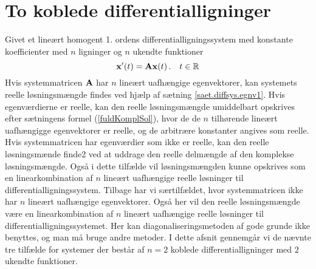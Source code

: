\section{To koblede differentialligninger} \label{sek.diffsys.struktur1}

Givet et lineært homogent 1. ordens differentialligningssystem med konstante koefficienter med $ n $ ligninger og $ n $ ukendte funktioner
\begin{equation}
\mathbf{x}'(t) = \mathbf{A} \mathbf{x}(t)\,. \quad t \in \mathbb{R}
\end{equation}
Hvis systemmatricen $\mathbf{A}$ har $n$ lineært uafhængige egenvektorer, kan systemets reelle løsningsmængde findes ved hjælp af sætning \ref{saet.diffsys.egnv1}. Hvis egenværdierne er reelle, kan den reelle løsningsmængde umiddelbart opskrives efter sætningens formel (\ref{fuldKomplSol}), hvor de de $n$ tilhørende lineært uafhængigge egenvektorer er reelle, og de arbitrære konstanter angives som reelle. Hvis systemmatricen har egenværdier som ikke er reelle, kan den reelle løsningsmænde finde2 ved at uddrage den reelle delmængde af den komplekse løsningsmængde. Også i dette tilfælde vil løsningsmængden kunne opskrives som en linearkombination af $n$ lineært uafhængige reelle løsninger til differentialligningssystem.\bs
Tilbage har vi særtilfældet, hvor systemmatricen ikke har $n$ lineært uafhængige egenvektorer. Også her vil den reelle løsningsmængde være en linearkombination af $n$ lineært uafhængige reelle løsninger til differentialligningssystemet. Her kan diagonaliseringsmetoden af gode grunde ikke benyttes, og man må bruge andre metoder.\bs
I dette afsnit gennemgår vi de nævnte tre tilfælde for  systemer der består af $ n = 2 $ koblede differentialligninger med $2$ ukendte funktioner.

